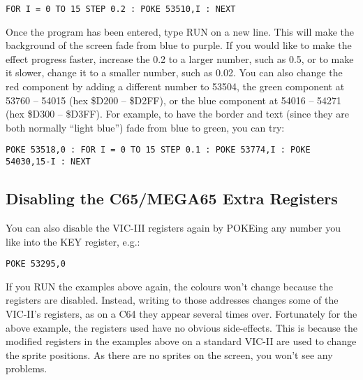 \begin{tcolorbox}[colback=black,coltext=white]
\verbatimfont{\codefont}
\begin{verbatim}
FOR I = 0 TO 15 STEP 0.2 : POKE 53510,I : NEXT
\end{verbatim}
\end{tcolorbox}

Once the program has been entered, type RUN on a new line. This will make the background of the screen fade from
blue to purple.  If you would like to make the effect progress faster, increase the 0.2 to a larger number, such as 0.5, or to
make it slower, change it to a smaller number, such as 0.02. You can also change the red component by adding a
different number to 53504, the green component at 53760 -- 54015 (hex \$D200 -- \$D2FF), or the
blue component at 54016 -- 54271 (hex \$D300 -- \$D3FF).  For example, to have
the border and text (since they are both normally ``light blue'') fade from blue to green, you can try:

\begin{tcolorbox}[colback=black,coltext=white]
\verbatimfont{\codefont}
\begin{verbatim}
POKE 53518,0 : FOR I = 0 TO 15 STEP 0.1 : POKE 53774,I : POKE 54030,15-I : NEXT
\end{verbatim}
\end{tcolorbox}

\subsection{Disabling the C65/MEGA65 Extra Registers}

You can also disable the VIC-III registers again by POKEing any number you like into the KEY register, e.g.:

\begin{tcolorbox}[colback=black,coltext=white]
\verbatimfont{\codefont}
\begin{verbatim}
POKE 53295,0
\end{verbatim}
\end{tcolorbox}

If you RUN the examples above again, the colours won't change because
the registers are disabled. Instead, writing to those addresses changes some of the VIC-II's registers,
as on a C64 they appear several times over.  Fortunately for the above example, the registers used have no obvious
side-effects. This is because the modified registers in the examples above on a standard VIC-II are used to change the
sprite positions. As there are no sprites on the screen, you won't see any problems.

